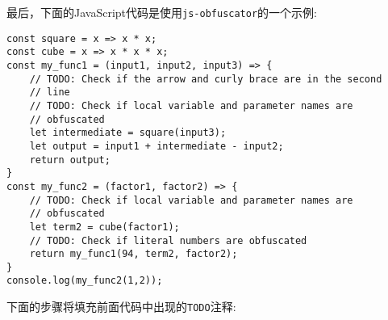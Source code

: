 最后，下面的JavaScript代码是使用\texttt{js-obfuscator}的一个示例:

\begin{lstlisting}[style=styleJavaScript]
const square = x => x * x;
const cube = x => x * x * x;
const my_func1 = (input1, input2, input3) => {
	// TODO: Check if the arrow and curly brace are in the second
	// line
	// TODO: Check if local variable and parameter names are
	// obfuscated
	let intermediate = square(input3);
	let output = input1 + intermediate - input2;
	return output;
}
const my_func2 = (factor1, factor2) => {
	// TODO: Check if local variable and parameter names are
	// obfuscated
	let term2 = cube(factor1);
	// TODO: Check if literal numbers are obfuscated
	return my_func1(94, term2, factor2);
}
console.log(my_func2(1,2));
\end{lstlisting}


下面的步骤将填充前面代码中出现的\texttt{TODO}注释:

